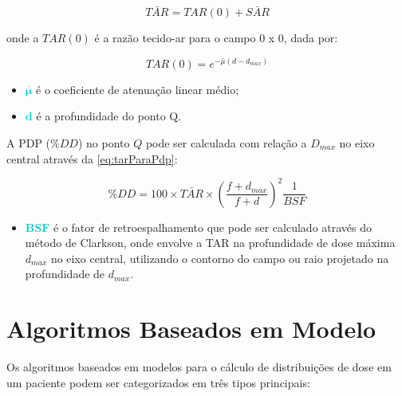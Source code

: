 \documentclass[11pt,a4paper]{article}
\newcounter{exemplo}
\begin{document}
		\begin{equation}
			\bar{TAR} = TAR(0) + \bar{SAR}
		\end{equation}

	onde a $TAR(0)$ é a razão tecido-ar para o campo 0 x 0, dada por:

		$$TAR(0) = e^{-\bar{\mu} (d - d_{max})}$$

	\begin{exemplo}[onde:]
		\begin{itemize}
			\item \textcolor{DarkTurquoise}{$\mathbf{\bar{\mu}}$} é o coeficiente de atenuação linear médio;
			\item \textcolor{DarkTurquoise}{$\mathbf{d}$} é a profundidade do ponto Q.
		\end{itemize}
	\end{exemplo}

	A PDP ($\%DD$) no ponto $Q$ pode ser calculada com relação a $D_{max}$ no eixo central através da \ref{eq:tarParaPdp}:

		\begin{equation}
			\%DD = 100 \times \bar{TAR} \times \left(\frac{f + d_{max}}{f + d}\right)^2 \frac{1}{BSF}
		\end{equation}

	\begin{exemplo}[onde:]
		\begin{itemize}
			\item \textcolor{DarkTurquoise}{$\mathbf{BSF}$} é o fator de retroespalhamento que pode ser calculado através do método de Clarkson, onde envolve a TAR na profundidade de dose máxima $d_{max}$ no eixo central, utilizando o contorno do campo ou raio projetado na profundidade de $d_{max}$.
		\end{itemize}
	\end{exemplo}

\section{Algoritmos Baseados em Modelo}

	Os algoritmos baseados em modelos para o cálculo de distribuições de dose em um paciente podem ser categorizados em três tipos principais:
\end{document}
